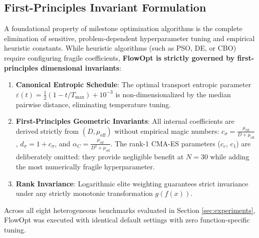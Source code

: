 \documentclass[10pt,journal,compsoc]{IEEEtran}
\begin{document}
\subsection{First-Principles Invariant Formulation}
A foundational property of milestone optimization algorithms is the complete elimination of sensitive, problem-dependent hyperparameter tuning and empirical heuristic constants. While heuristic algorithms (such as PSO, DE, or CBO) require configuring fragile coefficients, \textbf{FlowOpt is strictly governed by first-principles dimensional invariants}:
\begin{enumerate}\setlength{\itemsep}{1pt}\setlength{\parskip}{0pt}
    \item \textbf{Canonical Entropic Schedule}: The optimal transport entropic parameter $\varepsilon(t) = \frac{1}{2}(1 - t/T_{\max}) + 10^{-3}$ is non-dimensionalized by the median pairwise distance, eliminating temperature tuning.
    \item \textbf{First-Principles Geometric Invariants}: All internal coefficients are derived strictly from $(D, \mu_{\text{eff}})$ without empirical magic numbers: $c_\sigma = \frac{\mu_{\text{eff}}}{D + \mu_{\text{eff}}}$, $d_\sigma = 1 + c_\sigma$, and $\alpha_C = \frac{\mu_{\text{eff}}}{D^2 + \mu_{\text{eff}}}$. The rank-1 CMA-ES parameters ($c_c$, $c_1$) are deliberately omitted: they provide negligible benefit at $N=30$ while adding the most numerically fragile hyperparameter.
    \item \textbf{Rank Invariance}: Logarithmic elite weighting guarantees strict invariance under any strictly monotonic transformation $g(f(x))$.
\end{enumerate}
Across all eight heterogeneous benchmarks evaluated in Section \ref{sec:experiments}, FlowOpt was executed with identical default settings with zero function-specific tuning.
\end{document}
